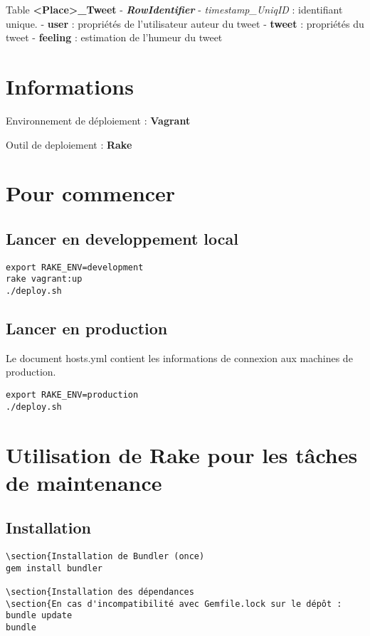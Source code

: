 \documentclass[a4paper,oneside,11pt]{article}
\begin{document}
Table \textbf{<Place>\_Tweet}
- \textbf{\textit{RowIdentifier}} - \textit{timestamp\_UniqID} : identifiant unique.
- \textbf{user} : propriétés de l'utilisateur auteur du tweet
- \textbf{tweet} : propriétés du tweet
- \textbf{feeling} : estimation de l'humeur du tweet


\section{Informations}

Environnement de déploiement : \textbf{Vagrant}

Outil de deploiement : \textbf{Rake}

\section{Pour commencer}

\subsection{Lancer en developpement local}

\begin{verbatim}
export RAKE_ENV=development
rake vagrant:up
./deploy.sh
\end{verbatim}

\subsection{Lancer en production}

Le document hosts.yml contient les informations de connexion aux machines de production. 

\begin{verbatim}
export RAKE_ENV=production
./deploy.sh
\end{verbatim}


\section{Utilisation de Rake pour les tâches de maintenance}

\subsection{Installation}

\begin{verbatim}
\section{Installation de Bundler (once)
gem install bundler

\section{Installation des dépendances
\section{En cas d'incompatibilité avec Gemfile.lock sur le dépôt : bundle update
bundle
\end{verbatim}
\end{document}
